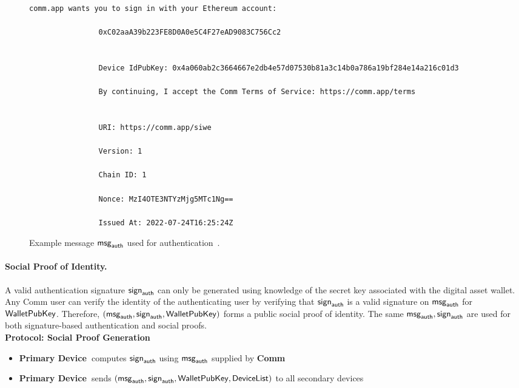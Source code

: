 \documentclass{article}
\newcommand{\signauth}{{\sf sign}_{\sf auth}}
\newcommand{\msgauth}{{\sf msg}_{\sf auth}}
\newcommand{\dl}{{\sf DeviceList}}
\newcommand{\wpk}{{\sf WalletPubKey}}
\newcommand{\pdevice}{{\bf \color{red} Primary Device~}}
\newcommand{\comm}{{\bf \color{blue} Comm~}}
\begin{document}
\begin{figure}[htb!]
    \centering
        \begin{Verbatim}[frame=single]
                comm.app wants you to sign in with your Ethereum account:
                
                0xC02aaA39b223FE8D0A0e5C4F27eAD9083C756Cc2

                
                Device IdPubKey: 0x4a060ab2c3664667e2db4e57d07530b81a3c14b0a786a19bf284e14a216c01d3
                
                By continuing, I accept the Comm Terms of Service: https://comm.app/terms


                URI: https://comm.app/siwe
                
                Version: 1

                Chain ID: 1

                Nonce: MzI4OTE3NTYzMjg5MTc1Ng==

                Issued At: 2022-07-24T16:25:24Z
        \end{Verbatim}
    \caption{Example message $\msgauth$ used for authentication~\cite{siwe}.}
    \label{fig:authmessage}
\end{figure}


\paragraph{Social Proof of Identity.} A valid authentication signature $\signauth$ can only be generated using knowledge of the secret key associated with the digital asset wallet. Any Comm user can verify the identity of the authenticating user by verifying that $\signauth$ is a valid signature on $\msgauth$ for $\wpk$. Therefore, $(\msgauth, \signauth, \wpk)$ forms a public social proof of identity. The same $\msgauth, \signauth$ are used for both signature-based authentication and social proofs.\\

\noindent \textbf{Protocol: Social Proof Generation}
\begin{itemize}
    \item \pdevice computes $\signauth$ using $\msgauth$ supplied by \comm
    \item \pdevice sends $(\msgauth, \signauth, \wpk, \dl)$ to all secondary devices
\end{itemize}
\end{document}
